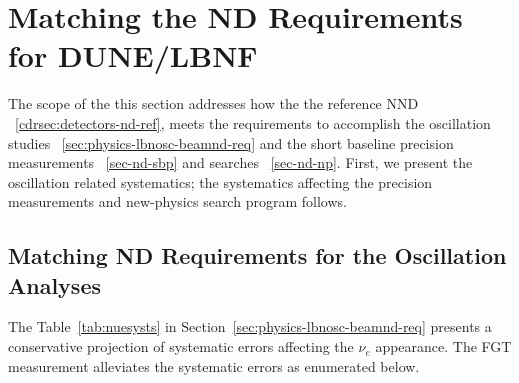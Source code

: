 
\section{Matching the ND Requirements for DUNE/LBNF} 
\label{cdrsec:detectors-nd-ref-fgt-req}

The scope of the this section addresses how the the reference NND ~\ref{cdrsec:detectors-nd-ref}, 
meets the requirements  to accomplish the oscillation studies 
~\ref{sec:physics-lbnosc-beamnd-req} and the short baseline precision measurements ~\ref{sec-nd-sbp} 
and searches ~\ref{sec-nd-np}. First, we present the oscillation related systematics; 
the systematics affecting the  precision measurements and new-physics search program follows. 


\subsection{Matching ND Requirements for the Oscillation Analyses} 
\label{cdrsec:detectors-nd-ref-fgt-req-oscl}

The Table~\ref{tab:nuesysts} in Section~\ref{sec:physics-lbnosc-beamnd-req} presents a conservative 
projection of systematic errors affecting the $\nu_e$ appearance. The FGT measurement alleviates the 
systematic errors as enumerated below. 

